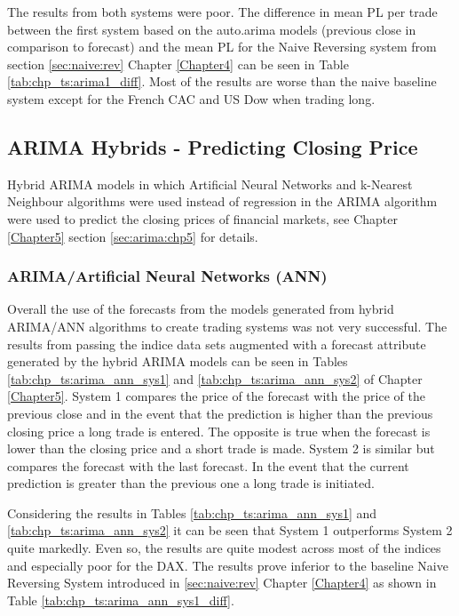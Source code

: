 The results from both systems were poor. The difference in mean PL per trade between the first system based on the auto.arima models (previous close in comparison to forecast) and the mean PL for the Naive Reversing system from section \ref{sec:naive:rev} Chapter \ref{Chapter4} can be seen in Table \ref{tab:chp_ts:arima1_diff}. Most of the results are worse than the naive baseline system except for the French CAC and US Dow when trading long.



\subsection{ARIMA Hybrids - Predicting Closing Price}
Hybrid ARIMA models in which Artificial Neural Networks and k-Nearest Neighbour algorithms were used instead of regression in the ARIMA algorithm were used to predict the closing prices of financial markets, see Chapter \ref{Chapter5} section \ref{sec:arima:chp5} for details.

\subsubsection{ARIMA/Artificial Neural Networks (ANN)}
Overall the use of the forecasts from the models generated from hybrid ARIMA/ANN algorithms to create trading systems was not very successful. The results from passing the indice data sets augmented with a forecast attribute generated by the hybrid ARIMA models can be seen in Tables  \ref{tab:chp_ts:arima_ann_sys1} and \ref{tab:chp_ts:arima_ann_sys2} of Chapter \ref{Chapter5}. System 1 compares the price of the forecast with the price of the previous close and in the event that the prediction is higher than the previous closing price a long trade is entered. The opposite is true when the forecast is lower than the closing price and a short trade is made. System 2 is similar but compares the forecast with the last forecast. In the event that the current prediction is greater than the previous one a long trade is initiated.

Considering the results in Tables \ref{tab:chp_ts:arima_ann_sys1} and \ref{tab:chp_ts:arima_ann_sys2} it can be seen that System 1 outperforms System 2 quite markedly. Even so, the results are quite modest across most of the indices and especially poor for the DAX. The results prove inferior to the baseline Naive Reversing System introduced in \ref{sec:naive:rev} Chapter \ref{Chapter4} as shown in Table \ref{tab:chp_ts:arima_ann_sys1_diff}.


